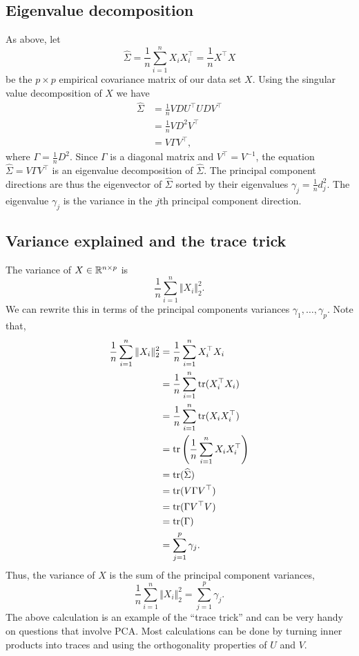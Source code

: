 \subsection{Eigenvalue decomposition}

As above, let 
\[
    \widehat{\Sigma}=\frac{1}{n}\sum_{i=1}^n X_iX_i^\top = \frac{1}{n}X^\top X 
\] 
be the $p \times p$ empirical covariance matrix of our data set $X$. Using the singular value decomposition of $X$ we have
\begin{align*}
    \widehat{\Sigma}&=\frac{1}{n} VDU^\top U DV^\top \\
    &=\frac{1}{n} V D^2 V^\top\\
    &=V\Gamma V^\top,
\end{align*}
where $\Gamma = \frac{1}{n}D^2$. Since $\Gamma$ is a diagonal matrix and $V^\top = V^{-1}$, the equation $\widehat{\Sigma} = V\Gamma V^\top$ is an eigenvalue decomposition of $\widehat{\Sigma}$. The principal component directions are thus the eigenvector of $\widehat{\Sigma}$ sorted by their eigenvalues $\gamma_j = \frac{1}{n}d_j^2$. The eigenvalue $\gamma_j$ is the variance in the $j$th principal component direction.

\subsection{Variance explained and the trace trick}

The variance of $X \in \mathbb{R}^{n \times p}$ is 
\[\frac{1}{n}\sum_{i=1}^n \Vert X_i \Vert_2^2. \]
We can rewrite this in terms of the principal components variances $\gamma_1,\ldots, \gamma_p$. Note that,
\begin{align*}
    \frac{1}{n}\sum_{i=1}^n \Vert X_i \Vert_2^2&=\frac{1}{n}\sum_{i=1}^n X_i^\top X_i \\
    &=\frac{1}{n} \sum_{i=1}^n \operatorname{tr}(X_i^\top X_i)\\
    &=\frac{1}{n}\sum_{i=1}^n \operatorname{tr}(X_iX_i^\top)\\
    &=\operatorname{tr}\left(\frac{1}{n}\sum_{i=1}^n X_iX_i^\top \right)\\
    &=\operatorname{tr}(\widehat{\Sigma})\\
    &=\operatorname{tr}(V\Gamma V^\top)\\
    &=\operatorname{tr}(\Gamma V^\top V)\\
    &=\operatorname{tr}(\Gamma)\\
    &=\sum_{j=1}^p \gamma_j.
\end{align*}
Thus, the variance of $X$ is the sum of the principal component variances,
\[\frac{1}{n}\sum_{i=1}^n \Vert X_i \Vert_2^2 = \sum_{j=1}^p \gamma_j. \]
The above calculation is an example of the ``trace trick'' and can be very handy on questions that involve PCA. Most calculations can be done by turning inner products into traces and using the orthogonality properties of $U$ and $V$.

